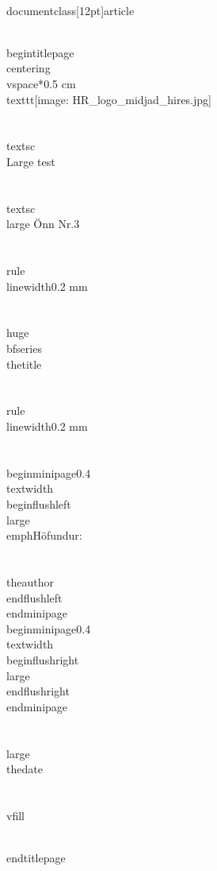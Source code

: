 \\documentclass[12pt]{article}
\begin{document}

\\begin{titlepage}
    \\centering
    \\vspace*{0.5 cm}
    \\texttt{[image: HR\_logo\_midjad\_hires.jpg]}\\\\[1.0 cm]	%
    \\textsc{\\Large test}\\\\[0.5 cm]				%
    \\textsc{\\large Önn Nr.3}\\\\[0.5 cm]				%
    \\rule{\\linewidth}{0.2 mm} \\\\[0.4 cm]
    { \\huge \\bfseries \\thetitle}\\\\
    \\rule{\\linewidth}{0.2 mm} \\\\[1.5 cm]
    
    \\begin{minipage}{0.4\\textwidth}
        \\begin{flushleft} \\large
            \\emph{Höfundur:}\\\\
            \\theauthor
            \\end{flushleft}
            \\end{minipage}~
            \\begin{minipage}{0.4\\textwidth}
            \\begin{flushright} \\large
        \\end{flushright}
    \\end{minipage}\\\\[2 cm]
    
    {\\large \\thedate}\\\\[2 cm]

    \\vfill
    
\\end{titlepage}


\
\end{document}
